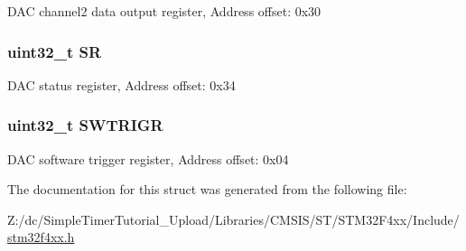 D\-A\-C channel2 data output register, Address offset\-: 0x30 \hypertarget{struct_d_a_c___type_def_af6aca2bbd40c0fb6df7c3aebe224a360}{
\subsubsection[{S\-R}]{ uint32\-\_\-t S\-R}}\label{struct_d_a_c___type_def_af6aca2bbd40c0fb6df7c3aebe224a360}
D\-A\-C status register, Address offset\-: 0x34 \hypertarget{struct_d_a_c___type_def_a896bbb7153af0b67ad772360feaceeb4}{
\subsubsection[{S\-W\-T\-R\-I\-G\-R}]{ uint32\-\_\-t S\-W\-T\-R\-I\-G\-R}}\label{struct_d_a_c___type_def_a896bbb7153af0b67ad772360feaceeb4}
D\-A\-C software trigger register, Address offset\-: 0x04 

The documentation for this struct was generated from the following file\-:\begin{DoxyCompactItemize}
\item 
Z\-:/dc/\-Simple\-Timer\-Tutorial\-\_\-\-Upload/\-Libraries/\-C\-M\-S\-I\-S/\-S\-T/\-S\-T\-M32\-F4xx/\-Include/\hyperlink{stm32f4xx_8h}{stm32f4xx.\-h}\end{DoxyCompactItemize}
